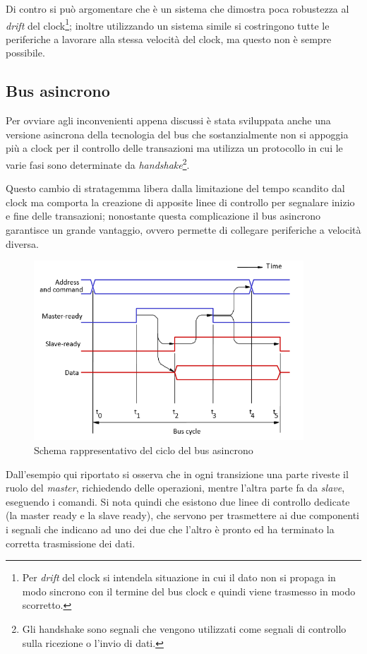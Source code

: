 \documentclass[class=book, crop=false, oneside]{standalone}
\begin{document}
Di contro si può argomentare che è un sistema che dimostra poca robustezza al \emph{drift} del clock\footnote{Per \emph{drift} del clock si intendela situazione in cui il dato non si propaga in modo sincrono con il  termine del bus clock e quindi viene trasmesso in modo scorretto.}; inoltre utilizzando un sistema simile si costringono tutte le periferiche a lavorare alla stessa velocità del clock, ma questo non è sempre possibile.

\subsection{Bus asincrono}
Per ovviare agli inconvenienti appena discussi è stata sviluppata anche una versione asincrona della tecnologia del bus che sostanzialmente non si appoggia più a clock per il controllo delle transazioni ma utilizza un protocollo in cui le varie fasi sono determinate da \emph{handshake}\footnote{Gli handshake sono segnali che vengono utilizzati come segnali di controllo sulla ricezione o l'invio di dati.}.

Questo cambio di stratagemma libera dalla limitazione del tempo scandito dal clock ma comporta la creazione di apposite linee di controllo per segnalare inizio e fine delle transazioni;
nonostante questa complicazione il bus asincrono garantisce un grande vantaggio, ovvero permette di collegare periferiche a velocità diversa.

\begin{figure}[!h]
	\centering
	\includegraphics[width=0.9\textwidth,keepaspectratio]{bus-asincrono}
	\caption{Schema rappresentativo del ciclo del bus asincrono}
\end{figure}
Dall'esempio qui riportato si osserva che in ogni transizione una parte riveste il ruolo del \emph{master}, richiedendo delle operazioni, mentre l'altra parte fa da \emph{slave}, eseguendo i comandi.
Si nota quindi che esistono due linee di controllo dedicate (la master ready e la slave ready), che servono per trasmettere ai due componenti i segnali che indicano ad uno dei due che l'altro è pronto ed ha terminato la corretta trasmissione dei dati.
\end{document}
